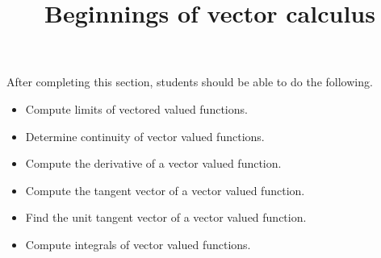 \documentclass{ximera}
\title{Beginnings of vector calculus}
\begin{document}
\begin{abstract}
\end{abstract}

\maketitle

\begin{sectionOutcomes}

After completing this section, students should be able to do the following.

\begin{itemize}
\item Compute limits of vectored valued functions.
\item Determine continuity of vector valued functions. 
\item Compute the derivative of a vector valued function. 
\item Compute the tangent vector of a vector valued function.
\item Find the unit tangent vector of a vector valued function.
\item Compute integrals of vector valued functions.
\end{itemize}

\end{sectionOutcomes}
\end{document}
